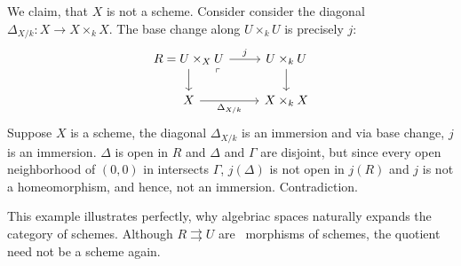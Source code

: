 \begin{example}
	We claim, that $X$ is not a scheme.
	Consider consider the diagonal $\Delta_{X/k}: X\to X\times_k X$. The base change along $U\times_k U$ is precisely $j$:
	\[\begin{tikzcd}
		{R=U\times_XU} & {U\times_kU} \\
		X & {X\times_kX}
		\arrow["j", from=1-1, to=1-2]
		\arrow[from=1-1, to=2-1]
		\arrow["\ulcorner"{anchor=center, pos=0.125}, draw=none, from=1-1, to=2-2]
		\arrow[from=1-2, to=2-2]
		\arrow["{\Delta_{X/k}}"', from=2-1, to=2-2]
	\end{tikzcd}\]
	Suppose $X$ is a scheme, the diagonal $\Delta_{X/k}$ is an immersion and via base change, $j$ is an immersion.  $\Delta$ is open in $R$ and $\Delta$ and $\Gamma$ are disjoint, but since every open neighborhood of $(0,0)$ in intersects $\Gamma$, $j(\Delta)$ is not open in $j(R)$ and $j$ is not a homeomorphism, and hence, not an immersion. Contradiction.
\end{example}

\begin{remark}
	This example illustrates perfectly, why algebriac spaces naturally expands the category of schemes. Although $R\rightrightarrows U$ are \etale\ morphisms of schemes, the quotient need not be a scheme again.
\end{remark}